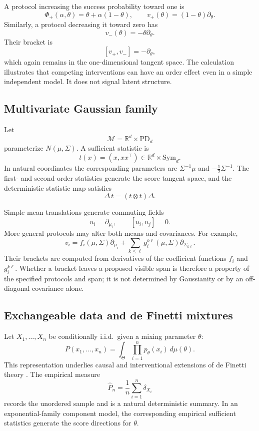 \documentclass{article}
\theoremstyle{plain}
\theoremstyle{definition}
\theoremstyle{remark}
\newcommand{\R}{\mathbb R}
\newcommand{\M}{\mathcal M}
\begin{document}
A protocol increasing the success probability toward one is
\[
  \Phi_+(\alpha,\theta)=\theta+\alpha(1-\theta),
  \qquad
  v_+(\theta)=(1-\theta)\partial_\theta.
\]
Similarly, a protocol decreasing it toward zero has
\[
  v_-(\theta)=-\theta\partial_\theta.
\]
Their bracket is
\[
  [v_+,v_-]=-\partial_\theta,
\]
which again remains in the one-dimensional tangent space.  The calculation
illustrates that competing interventions can have an order effect even in a
simple independent model.  It does not signal latent structure.

\subsection{Multivariate Gaussian family}

Let
\[
  \M=\R^d\times\mathrm{PD}_d
\]
parameterize \(N(\mu,\Sigma)\).  A sufficient statistic is
\[
  t(x)=(x,xx^\top)\in\R^d\times\mathrm{Sym}_d.
\]
In natural coordinates the corresponding parameters are
\(\Sigma^{-1}\mu\) and \(-\tfrac12\Sigma^{-1}\).  The first- and second-order
statistics generate the score tangent space, and the deterministic statistic
map satisfies
\[
  \Delta\,t=(t\otimes t)\Delta.
\]

Simple mean translations generate commuting fields
\[
  u_i=\partial_{\mu_i},
  \qquad [u_i,u_j]=0.
\]
More general protocols may alter both means and covariances.  For example,
\[
  v_i
  =
  f_i(\mu,\Sigma)\partial_{\mu_i}
  +\sum_{k\leq\ell}
    g^{k\ell}_i(\mu,\Sigma)\partial_{\Sigma_{k\ell}}.
\]
Their brackets are computed from derivatives of the coefficient functions
\(f_i\) and \(g_i^{k\ell}\).  Whether a bracket leaves a proposed visible span
is therefore a property of the specified protocols and span; it is not
determined by Gaussianity or by an off-diagonal covariance alone.

\subsection{Exchangeable data and de Finetti mixtures}

Let \(X_1,\ldots,X_n\) be conditionally i.i.d.\ given a mixing parameter
\(\theta\):
\[
  P(x_1,\ldots,x_n)
  =
  \int_\Theta\prod_{i=1}^n p_\theta(x_i)\,d\mu(\theta).
\]
This representation underlies causal and interventional extensions of de
Finetti theory \citep{guo2022causaldefinetti,guo2024dofinetti}.  The empirical
measure
\[
  \widehat P_n=\frac1n\sum_{i=1}^n\delta_{X_i}
\]
records the unordered sample and is a natural deterministic summary.  In an
exponential-family component model, the corresponding empirical sufficient
statistics generate the score directions for \(\theta\).
\end{document}
